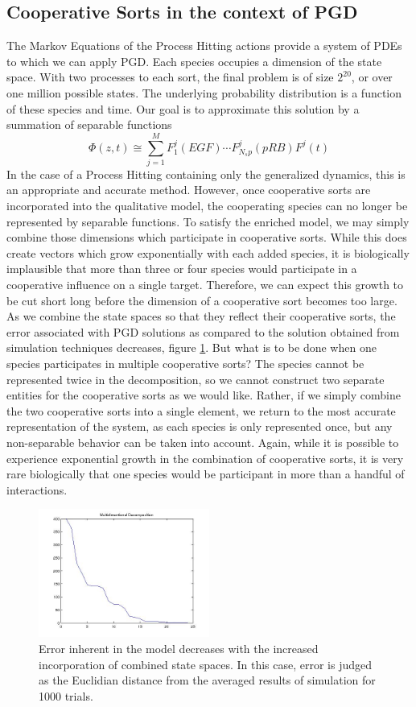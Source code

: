 \documentclass{article}
\begin{document}
\subsection{Cooperative Sorts in the context of PGD}
The Markov Equations of the Process Hitting actions provide a system of PDEs to which we can apply PGD. Each species occupies a dimension of the state space. With two processes to each sort, the final problem is of size $2^{20}$, or over one million possible states. The underlying probability distribution is a function of these species and time. Our goal is to approximate this solution by a summation of separable functions 
\[
 \Phi(z,t)\cong \sum_{j=1}^{M}F_1^j(EGF)\cdots F_{N_sp}^j(pRB) F^j(t)
\]
 In the case of a Process Hitting containing only the generalized dynamics, this is an appropriate and accurate method. However, once cooperative sorts are incorporated into the qualitative model, the cooperating species can no longer be represented by separable functions. To satisfy the enriched model, we may simply combine those dimensions which participate in cooperative sorts. While this does create vectors which grow exponentially with each added species, it is biologically implausible that more than three or four species would participate in a cooperative influence on a single target. Therefore, we can expect this growth to be cut short long before the dimension of a cooperative sort becomes too large. As we combine the state spaces so that they reflect their cooperative sorts, the error associated with PGD solutions as compared to the solution obtained from simulation techniques decreases, figure \ref{error_coop}. But what is to be done when one species participates in multiple cooperative sorts? The species cannot be represented twice in the decomposition, so we cannot construct two separate entities for the cooperative sorts as we would like. Rather, if we simply combine the two cooperative sorts into a single element, we return to the most accurate representation of the system, as each species is only represented once, but any non-separable behavior can be taken into account. Again, while it is possible to experience exponential growth in the combination of cooperative sorts, it is very rare biologically that one species would be participant in more than a handful of interactions.\\
 
\begin{figure}[h!]
\centering
 \includegraphics[width=0.5\textwidth]{singular_full.jpg}
 \caption{Error inherent in the model decreases with the increased incorporation of combined state spaces. In this case, error is judged as the Euclidian distance from the averaged results of simulation for 1000 trials.}
 \label{error_coop}
\end{figure}
\end{document}
